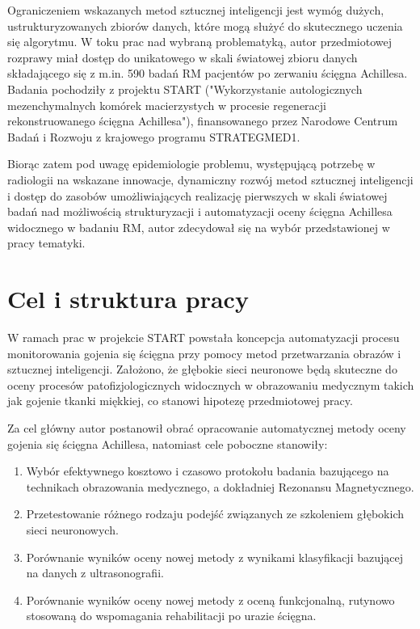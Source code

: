 Ograniczeniem wskazanych metod sztucznej inteligencji jest wymóg dużych, ustrukturyzowanych zbiorów danych, które mogą służyć do skutecznego uczenia się algorytmu. W toku prac nad wybraną problematyką, autor przedmiotowej rozprawy miał dostęp do unikatowego w skali światowej zbioru danych składającego się z m.in. 590 badań RM pacjentów po zerwaniu ścięgna Achillesa. Badania pochodziły z projektu START ("Wykorzystanie autologicznych mezenchymalnych komórek macierzystych w procesie regeneracji rekonstruowanego ścięgna Achillesa"), finansowanego przez Narodowe Centrum Badań i Rozwoju z krajowego programu STRATEGMED1.

Biorąc zatem pod uwagę epidemiologie problemu, występującą potrzebę w radiologii na wskazane innowacje, dynamiczny rozwój metod sztucznej inteligencji i dostęp do zasobów umożliwiających realizację pierwszych w skali światowej badań nad możliwością strukturyzacji i automatyzacji oceny ścięgna Achillesa widocznego w badaniu RM, autor zdecydował się na wybór przedstawionej w pracy tematyki.  
 

{\let\clearpage\relax\chapter*{Cel i struktura pracy}}

W ramach prac w projekcie START powstała koncepcja automatyzacji procesu monitorowania gojenia się ścięgna przy pomocy metod przetwarzania obrazów i sztucznej inteligencji. Założono, że głębokie sieci neuronowe będą skuteczne do oceny procesów patofizjologicznych widocznych w obrazowaniu medycznym takich jak gojenie tkanki miękkiej, co stanowi hipotezę przedmiotowej pracy.

Za cel główny autor postanowił obrać opracowanie automatycznej metody oceny gojenia się ścięgna Achillesa, natomiast cele poboczne stanowiły:
\begin{enumerate}
	\item Wybór efektywnego kosztowo i czasowo protokołu badania bazującego na technikach obrazowania medycznego, a dokładniej Rezonansu Magnetycznego.
	\item Przetestowanie różnego rodzaju podejść związanych ze szkoleniem głębokich sieci neuronowych.
	\item Porównanie wyników oceny nowej metody z wynikami klasyfikacji bazującej na danych z ultrasonografii.
	\item Porównanie wyników oceny nowej metody z oceną funkcjonalną, rutynowo stosowaną do wspomagania rehabilitacji po urazie ścięgna.
\end{enumerate}

